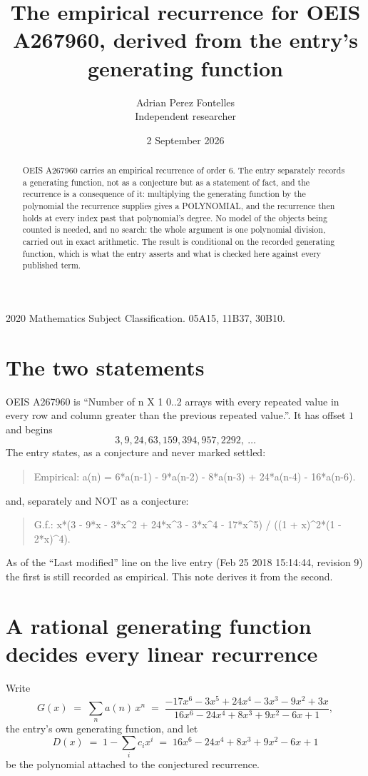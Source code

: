 \documentclass[11pt,a4paper]{article}
\title{The empirical recurrence for OEIS A267960, derived from the entry's generating function}
\author{Adrian Perez Fontelles\\ \small Independent researcher}
\date{2 September 2026}
\theoremstyle{plain}
\theoremstyle{definition}
\begin{document}
\maketitle

\begin{abstract}
OEIS A267960 carries an empirical recurrence of order $6$. The entry separately records a
generating function, not as a conjecture but as a statement of fact, and the recurrence is a
consequence of it: multiplying the generating function by the polynomial the recurrence
supplies gives a POLYNOMIAL, and the recurrence then holds at every index past that
polynomial's degree. No model of the objects being counted is needed, and no search: the
whole argument is one polynomial division, carried out in exact arithmetic. The result is
conditional on the recorded generating function, which is what the entry asserts and what is
checked here against every published term.
\end{abstract}

\noindent\small 2020 Mathematics Subject Classification. 05A15, 11B37, 30B10.\normalsize

\section{The two statements}

OEIS A267960 is ``Number of n X 1 0..2 arrays with every repeated value in every row and column greater than the previous repeated value.''. It has offset $1$ and begins
\[
3, 9, 24, 63, 159, 394, 957, 2292,\ \dots
\]
The entry states, as a conjecture and never marked settled:
\begin{quote}
Empirical: a(n) = 6*a(n-1) - 9*a(n-2) - 8*a(n-3) + 24*a(n-4) - 16*a(n-6).
\end{quote}
and, separately and NOT as a conjecture:
\begin{quote}
G.f.: x*(3 - 9*x - 3*x\^{}2 + 24*x\^{}3 - 3*x\^{}4 - 17*x\^{}5) / ((1 + x)\^{}2*(1 - 2*x)\^{}4).
\end{quote}
As of the ``Last modified'' line on the live entry (Feb 25 2018 15:14:44, revision 9) the first is still
recorded as empirical. This note derives it from the second.

\section{A rational generating function decides every linear recurrence}

Write
\[
G(x)\;=\;\sum_{n}a(n)\,x^{n}\;=\;\frac{- 17 x^{6} - 3 x^{5} + 24 x^{4} - 3 x^{3} - 9 x^{2} + 3 x}{16 x^{6} - 24 x^{4} + 8 x^{3} + 9 x^{2} - 6 x + 1},
\]
the entry's own generating function, and let
\[
D(x)\;=\;1-\sum_i c_i x^{i}\;=\;16 x^{6} - 24 x^{4} + 8 x^{3} + 9 x^{2} - 6 x + 1
\]
be the polynomial attached to the conjectured recurrence.
\end{document}
